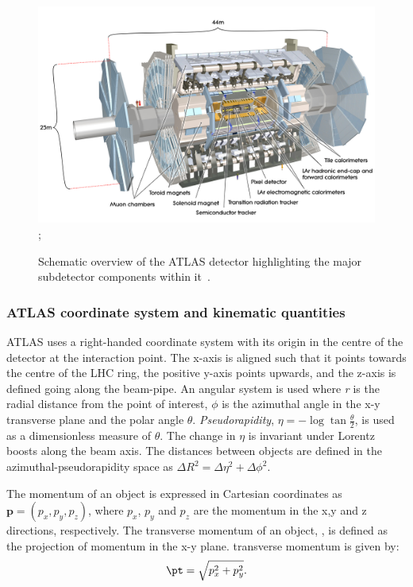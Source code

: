 \begin{figure}
    \centering
    \includegraphics[width=\textwidth]{images/ATLAS.png};
    \caption[Schematic of the ATLAS detector]{Schematic overview of the ATLAS detector highlighting the major subdetector components within it~\cite{ATLASImage}.}
    \label{fig:method:ATLAS}
\end{figure}

\subsubsection{ATLAS coordinate system and kinematic quantities}

ATLAS uses a right-handed coordinate system with its origin in the centre of the detector at the interaction point. The x-axis is aligned such that it points towards the centre of the LHC ring, the positive y-axis points upwards, and the z-axis is defined going along the beam-pipe. An angular system is used where \emph{r} is the radial distance from the point of interest, \emph{$\phi$} is the azimuthal angle in the x-y transverse plane and the polar angle \emph{$\theta$}. \emph{Pseudorapidity}, $\eta = -\log\tan\frac{\theta}{2}$, is used as a dimensionless measure of \emph{$\theta$}. The change in \emph{$\eta$} is invariant under Lorentz boosts along the beam axis. The distances between objects are defined in the azimuthal-pseudorapidity  space as $\Delta R^2 = \Delta \eta^2 + \Delta \phi^2$. 

The momentum of an object is expressed in Cartesian coordinates as $\textbf{p} = (p_x,p_y,p_z)$, where $p_x$, $p_y$ and $p_z$ are the momentum in the x,y and z directions, respectively. The transverse momentum of an object, \pt, is defined as the projection of momentum in the x-y plane. transverse momentum is given by:
\begin{equation}
    \pt = \sqrt{ p_{x}^{2} + p_{y}^{2}}.
\end{equation}

